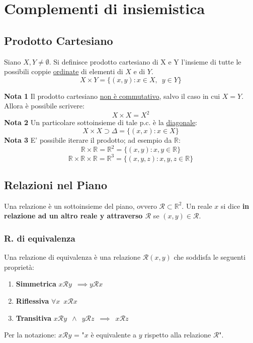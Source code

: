 \documentclass[10pt, oneside]{book}
\theoremstyle{plain}
\begin{document}
\chapter{Complementi di insiemistica}

\section{Prodotto Cartesiano}
\begin{defin}
Siano $X,Y \neq \emptyset $. Si definisce prodotto cartesiano di X e Y l'insieme di tutte le possibili coppie \underline{ordinate} di elementi di $X$ e di $Y$.
\[X \times Y = \{ (x,y) : x \in X, \enspace y \in Y\}\]
\end{defin}
\textbf{Nota 1} Il prodotto cartesiano \underline{non è commutativo}, salvo il caso in cui $X = Y$. Allora è possibile scrivere: \[X \times X = X^2\]
\textbf{Nota 2} Un particolare sottoinsieme di tale p.c. è la \underline{diagonale}: 
\[X \times X \supset \Delta = \{ (x,x) : x \in X\}\]
\textbf{Nota 3} E' possibile iterare il prodotto; ad esempio da  $\mathbb{R}$:
\[\mathbb{R} \times \mathbb{R} = \mathbb{R}^2 = \{(x,y) : x, y \in \mathbb{R}\}\]
\[\mathbb{R} \times \mathbb{R} \times \mathbb{R}= \mathbb{R}^3 = \{(x,y,z) : x, y, z \in \mathbb{R}\}\]

\section{Relazioni nel Piano}
\begin{defin}
Una relazione è un sottoinsieme del piano, ovvero $\mathcal{R} \subset \mathbb{R}^2$. Un reale $x$ si dice \textbf{in relazione ad un altro reale y attraverso $\mathcal{R}$} se $(x,y) \in \mathcal{R}$.
\end{defin}

\subsection{R. di equivalenza}
\begin{defin}
Una relazione di equivalenza è una relazione $\mathcal{R}(x,y)$ che soddisfa le seguenti proprietà:
\begin{enumerate}
    \item \textbf{Simmetrica} $x\mathcal{R}y \enspace \implies y\mathcal{R}x$
    \item \textbf{Riflessiva} $\forall x \enspace x\mathcal{R}x$
    \item \textbf{Transitiva} $x\mathcal{R}y \enspace \land \enspace y\mathcal{R}z\enspace \implies \enspace x\mathcal{R}z$
\end{enumerate}
Per la notazione: $x\mathcal{R}y$ = "$x$ è equivalente a $y$ rispetto alla relazione $\mathcal{R}$".
\end{defin}
\end{document}
